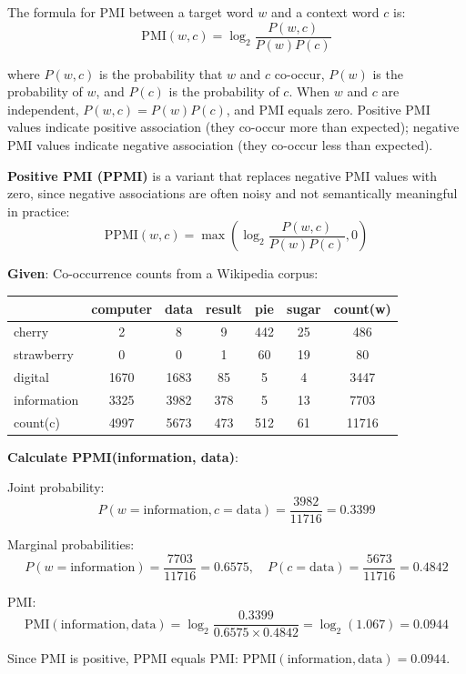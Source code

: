 \documentclass[11pt,a4paper]{article}
\begin{document}
The formula for PMI between a target word $w$ and a context word $c$ is:
\[
\text{PMI}(w, c) = \log_2 \frac{P(w, c)}{P(w)P(c)}
\]

where $P(w, c)$ is the probability that $w$ and $c$ co-occur, $P(w)$ is the probability of $w$, and $P(c)$ is the probability of $c$. When $w$ and $c$ are independent, $P(w, c) = P(w)P(c)$, and PMI equals zero. Positive PMI values indicate positive association (they co-occur more than expected); negative PMI values indicate negative association (they co-occur less than expected).

\textbf{Positive PMI (PPMI)} is a variant that replaces negative PMI values with zero, since negative associations are often noisy and not semantically meaningful in practice:
\[
\text{PPMI}(w, c) = \max\left(\log_2 \frac{P(w, c)}{P(w)P(c)}, 0\right)
\]

\begin{tcolorbox}[colback=green!5!white,colframe=green!75!black,title=\textbf{Numerical: PPMI Calculation}]
\textbf{Given}: Co-occurrence counts from a Wikipedia corpus:
\begin{center}
\begin{tabular}{|l|c|c|c|c|c|c|}
\hline
 & computer & data & result & pie & sugar & count(w) \\ \hline
cherry & 2 & 8 & 9 & 442 & 25 & 486 \\ \hline
strawberry & 0 & 0 & 1 & 60 & 19 & 80 \\ \hline
digital & 1670 & 1683 & 85 & 5 & 4 & 3447 \\ \hline
information & 3325 & 3982 & 378 & 5 & 13 & 7703 \\ \hline
count(c) & 4997 & 5673 & 473 & 512 & 61 & 11716 \\ \hline
\end{tabular}
\end{center}

\textbf{Calculate PPMI(information, data)}:

Joint probability:
\[
P(w=\text{information}, c=\text{data}) = \frac{3982}{11716} = 0.3399
\]

Marginal probabilities:
\[
P(w=\text{information}) = \frac{7703}{11716} = 0.6575, \quad
P(c=\text{data}) = \frac{5673}{11716} = 0.4842
\]

PMI:
\[
\text{PMI}(\text{information}, \text{data}) = \log_2 \frac{0.3399}{0.6575 \times 0.4842} = \log_2(1.067) = 0.0944
\]

Since PMI is positive, PPMI equals PMI: $\text{PPMI}(\text{information}, \text{data}) = 0.0944$.
\end{tcolorbox}
\end{document}
